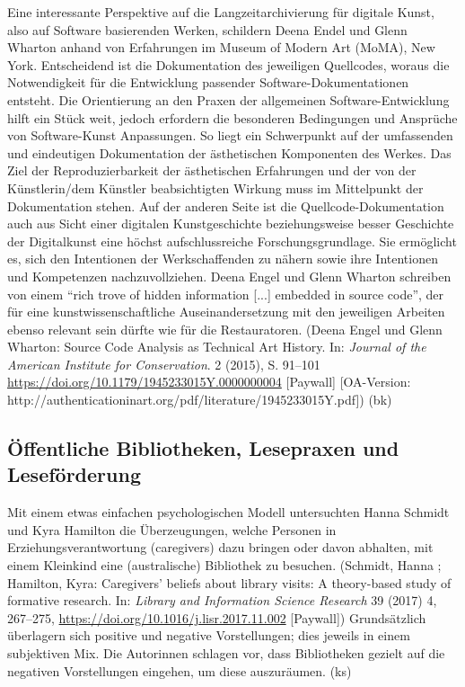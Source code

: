 \documentclass[a4paper,
fontsize=11pt,
oneside,
numbers=noperiodatend,
parskip=half-,
bibliography=totoc,
final
]{scrartcl}
\begin{document}
Eine interessante Perspektive auf die Langzeitarchivierung für digitale
Kunst, also auf Software basierenden Werken, schildern Deena Endel und
Glenn Wharton anhand von Erfahrungen im Museum of Modern Art (MoMA), New
York. Entscheidend ist die Dokumentation des jeweiligen Quellcodes,
woraus die Notwendigkeit für die Entwicklung passender
Software-Dokumentationen entsteht. Die Orientierung an den Praxen der
allgemeinen Software-Entwicklung hilft ein Stück weit, jedoch erfordern
die besonderen Bedingungen und Ansprüche von Software-Kunst Anpassungen.
So liegt ein Schwerpunkt auf der umfassenden und eindeutigen
Dokumentation der ästhetischen Komponenten des Werkes. Das Ziel der
Reproduzierbarkeit der ästhetischen Erfahrungen und der von der
Künstlerin/dem Künstler beabsichtigten Wirkung muss im Mittelpunkt der
Dokumentation stehen. Auf der anderen Seite ist die
Quellcode-Dokumentation auch aus Sicht einer digitalen Kunstgeschichte
beziehungsweise besser Geschichte der Digitalkunst eine höchst
aufschlussreiche Forschungsgrundlage. Sie ermöglicht es, sich den
Intentionen der Werkschaffenden zu nähern sowie ihre Intentionen und
Kompetenzen nachzuvollziehen. Deena Engel und Glenn Wharton schreiben
von einem \enquote{rich trove of hidden information {[}...{]} embedded
in source code}, der für eine kunstwissenschaftliche Auseinandersetzung
mit den jeweiligen Arbeiten ebenso relevant sein dürfte wie für die
Restauratoren. (Deena Engel und Glenn Wharton: Source Code Analysis as
Technical Art History. In: \emph{Journal of the American Institute for
Conservation}. 2 (2015), S. 91--101
\url{https://doi.org/10.1179/1945233015Y.0000000004} {[}Paywall{]}
{[}OA-Version:
http://authenticationinart.org/pdf/literature/1945233015Y.pdf{]}) (bk)

\hypertarget{uxf6ffentliche-bibliotheken-lesepraxen-und-lesefuxf6rderung}{%
\subsection{Öffentliche Bibliotheken, Lesepraxen und
Leseförderung}\label{uxf6ffentliche-bibliotheken-lesepraxen-und-lesefuxf6rderung}}

Mit einem etwas einfachen psychologischen Modell untersuchten Hanna
Schmidt und Kyra Hamilton die Überzeugungen, welche Personen in
Erziehungsverantwortung (caregivers) dazu bringen oder davon abhalten,
mit einem Kleinkind eine (australische) Bibliothek zu besuchen.
(Schmidt, Hanna ; Hamilton, Kyra: Caregivers' beliefs about library
visits: A theory-based study of formative research. In: \emph{Library
and Information Science Research} 39 (2017) 4, 267--275,
\url{https://doi.org/10.1016/j.lisr.2017.11.002} {[}Paywall{]})
Grundsätzlich überlagern sich positive und negative Vorstellungen; dies
jeweils in einem subjektiven Mix. Die Autorinnen schlagen vor, dass
Bibliotheken gezielt auf die negativen Vorstellungen eingehen, um diese
auszuräumen. (ks)
\end{document}
